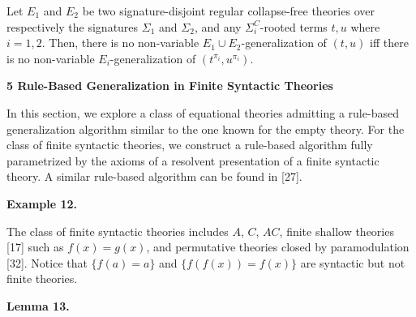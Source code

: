  
Let $E_{1}$ and $E_{2}$ be two signature-disjoint regular collapse-free theories over respectively the signatures $\Sigma_{1}$ and $\Sigma_{2}$, and any ${\Sigma}^{C}_{i}$-rooted terms $t,u$ where $i=1,2$. Then, there is no non-variable $E_{1}\cup E_{2}$-generalization of $(t,u)$ iff there is no non-variable $E_{i}$-generalization of $(t^{\pi_{i}},u^{\pi_{i}})$.\par
 
 
 
 


 
\par\medskip\noindent\textbf{5 Rule-Based Generalization in Finite Syntactic Theories}\par
 
 
In this section, we explore a class of equational theories admitting a rule-based generalization algorithm similar to the one known for the empty theory. For the class of finite syntactic theories, we construct a rule-based algorithm fully parametrized by the axioms of a resolvent presentation of a finite syntactic theory. A similar rule-based algorithm can be found in [27].\par
 
 
 
\par\medskip\noindent\textbf{Example 12.}\par
 
 
The class of finite syntactic theories includes $A$, $C$, $AC$, finite shallow theories [17] such as $f(x)=g(x)$, and permutative theories closed by paramodulation [32]. Notice that $\{f(a)=a\}$ and $\{f(f(x))=f(x)\}$ are syntactic but not finite theories.\par
 
 
 
 
\par\medskip\noindent\textbf{Lemma 13.}\par
 
 
